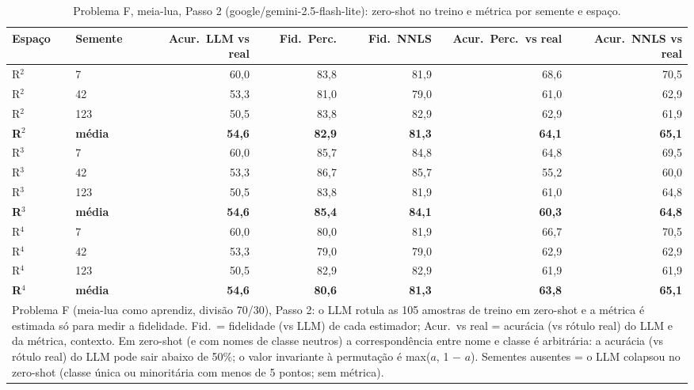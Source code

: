 \begin{table}[htbp]
\centering
\small
\caption{Problema F, meia-lua, Passo 2 (google/gemini-2.5-flash-lite): zero-shot no treino e métrica por semente e espaço.}
\label{tab:bloco2_F_passo2_R2_R3_R4_flashlite}
\begin{tabular}{llrrrrr}
\toprule
Espaço & Semente & Acur.\ LLM vs real & Fid.\ Perc. & Fid.\ NNLS & Acur.\ Perc.\ vs real & Acur.\ NNLS vs real \\
\midrule
R$^2$ & 7 & 60,0 & 83,8 & 81,9 & 68,6 & 70,5 \\
R$^2$ & 42 & 53,3 & 81,0 & 79,0 & 61,0 & 62,9 \\
R$^2$ & 123 & 50,5 & 83,8 & 82,9 & 62,9 & 61,9 \\
\textbf{R$^2$} & \textbf{média} & \textbf{54,6} & \textbf{82,9} & \textbf{81,3} & \textbf{64,1} & \textbf{65,1} \\
\midrule
R$^3$ & 7 & 60,0 & 85,7 & 84,8 & 64,8 & 69,5 \\
R$^3$ & 42 & 53,3 & 86,7 & 85,7 & 55,2 & 60,0 \\
R$^3$ & 123 & 50,5 & 83,8 & 81,9 & 61,0 & 64,8 \\
\textbf{R$^3$} & \textbf{média} & \textbf{54,6} & \textbf{85,4} & \textbf{84,1} & \textbf{60,3} & \textbf{64,8} \\
\midrule
R$^4$ & 7 & 60,0 & 80,0 & 81,9 & 66,7 & 70,5 \\
R$^4$ & 42 & 53,3 & 79,0 & 79,0 & 62,9 & 62,9 \\
R$^4$ & 123 & 50,5 & 82,9 & 82,9 & 61,9 & 61,9 \\
\textbf{R$^4$} & \textbf{média} & \textbf{54,6} & \textbf{80,6} & \textbf{81,3} & \textbf{63,8} & \textbf{65,1} \\
\bottomrule
\multicolumn{7}{p{0.95\linewidth}}{\footnotesize Problema F (meia-lua como aprendiz, divisão 70/30), Passo 2: o LLM rotula as 105 amostras de treino em zero-shot e a métrica é estimada só para medir a fidelidade. Fid.\ = fidelidade (vs LLM) de cada estimador; Acur.\ vs real = acurácia (vs rótulo real) do LLM e da métrica, contexto. Em zero-shot (e com nomes de classe neutros) a correspondência entre nome e classe é arbitrária: a acurácia (vs rótulo real) do LLM pode sair abaixo de 50\%; o valor invariante à permutação é max($a$, 1 $-$ $a$). Sementes ausentes = o LLM colapsou no zero-shot (classe única ou minoritária com menos de 5 pontos; sem métrica).} \\
\end{tabular}
\end{table}
